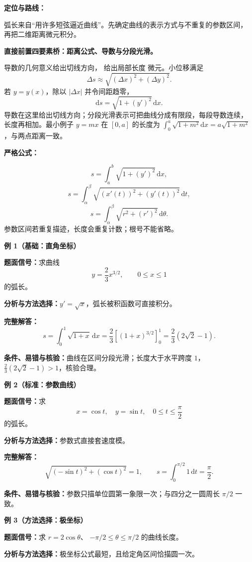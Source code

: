 \begin{knowledgeBox}
\textbf{定位与路线：}

弧长来自“用许多短弦逼近曲线”。先确定曲线的表示方式与不重复的参数区间，
再把二维距离微元积分。

\textbf{直接前置四要素桥：距离公式、导数与分段光滑。}

导数的几何意义给出切线方向，
给出局部长度
微元。小位移满足
\[
\Delta s\approx\sqrt{(\Delta x)^2+(\Delta y)^2}.
\]
若 \(y=y(x)\)，除以 \(|\Delta x|\) 并令间距趋零，
\[
\mathrm ds=\sqrt{1+(y')^2}\,\mathrm dx.
\]
导数在这里给出切线方向；分段光滑表示可把曲线分成有限段，每段导数连续，
长度再相加。最小例子 \(y=mx\) 在 \([0,a]\) 的长度为
\(\int_0^a\sqrt{1+m^2}\mathrm dx=a\sqrt{1+m^2}\)，与两点距离一致。

\textbf{严格公式：}

\[
s=\int_a^b\sqrt{1+(y')^2}\,\mathrm dx,
\]
\[
s=\int_\alpha^\beta
\sqrt{(x'(t))^2+(y'(t))^2}\,\mathrm dt,
\]
\[
s=\int_\alpha^\beta\sqrt{r^2+(r')^2}\,\mathrm d\theta.
\]
参数区间若重复描迹，长度会重复计数；根号不能省略。

\textbf{例 1（基础：直角坐标）}

\textbf{题面信号：}求曲线
\[
y=\frac23x^{3/2},\qquad0\le x\le1
\]
的弧长。

\textbf{分析与方法选择：}\(y'=\sqrt x\)，弧长被积函数可直接积分。

\textbf{完整解答：}
\[
s=\int_0^1\sqrt{1+x}\,\mathrm dx
=\frac23\left[(1+x)^{3/2}\right]_0^1
=\frac23(2\sqrt2-1).
\]

\textbf{条件、易错与核验：}曲线在区间分段光滑；长度大于水平跨度 \(1\)，
\(\frac23(2\sqrt2-1)>1\)，核验合理。

\textbf{例 2（标准：参数曲线）}

\textbf{题面信号：}求
\[
x=\cos t,\quad y=\sin t,\quad0\le t\le\frac\pi2
\]
的弧长。

\textbf{分析与方法选择：}参数式直接套速度模。

\textbf{完整解答：}
\[
\sqrt{(-\sin t)^2+(\cos t)^2}=1,
\qquad
s=\int_0^{\pi/2}1\,\mathrm dt=\frac\pi2.
\]

\textbf{条件、易错与核验：}参数只描单位圆第一象限一次；与四分之一圆周长
\(\pi/2\) 一致。

\textbf{例 3（方法选择：极坐标）}

\textbf{题面信号：}求 \(r=2\cos\theta\)、
\(-\pi/2\le\theta\le\pi/2\) 的曲线长度。

\textbf{分析与方法选择：}极坐标公式最短，且给定角区间恰描圆一次。


\end{knowledgeBox}

